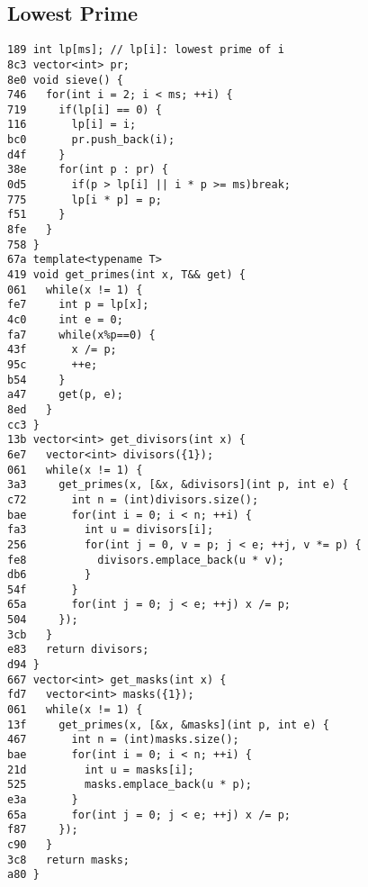 \documentclass[10pt, a4paper, twoside]{article}
\begin{document}
\subsection{Lowest Prime
}
\begin{lstlisting}
189 int lp[ms]; // lp[i]: lowest prime of i
8c3 vector<int> pr;
8e0 void sieve() {
746   for(int i = 2; i < ms; ++i) {
719     if(lp[i] == 0) {
116       lp[i] = i;
bc0       pr.push_back(i);
d4f     }
38e     for(int p : pr) {
0d5       if(p > lp[i] || i * p >= ms)break;
775       lp[i * p] = p;
f51     }
8fe   }
758 }
67a template<typename T>
419 void get_primes(int x, T&& get) {
061   while(x != 1) {
fe7     int p = lp[x];
4c0     int e = 0;
fa7     while(x%p==0) {
43f       x /= p;
95c       ++e;
b54     }
a47     get(p, e);
8ed   }
cc3 }
13b vector<int> get_divisors(int x) {
6e7   vector<int> divisors({1});
061   while(x != 1) {
3a3     get_primes(x, [&x, &divisors](int p, int e) {
c72       int n = (int)divisors.size();
bae       for(int i = 0; i < n; ++i) {
fa3         int u = divisors[i];
256         for(int j = 0, v = p; j < e; ++j, v *= p) {
fe8           divisors.emplace_back(u * v);
db6         }
54f       }   
65a       for(int j = 0; j < e; ++j) x /= p;
504     });
3cb   }
e83   return divisors;
d94 }
667 vector<int> get_masks(int x) {
fd7   vector<int> masks({1});
061   while(x != 1) {
13f     get_primes(x, [&x, &masks](int p, int e) {
467       int n = (int)masks.size();
bae       for(int i = 0; i < n; ++i) {
21d         int u = masks[i];
525         masks.emplace_back(u * p);
e3a       }   
65a       for(int j = 0; j < e; ++j) x /= p;
f87     });
c90   }
3c8   return masks;
a80 }
\end{lstlisting}
\end{document}
